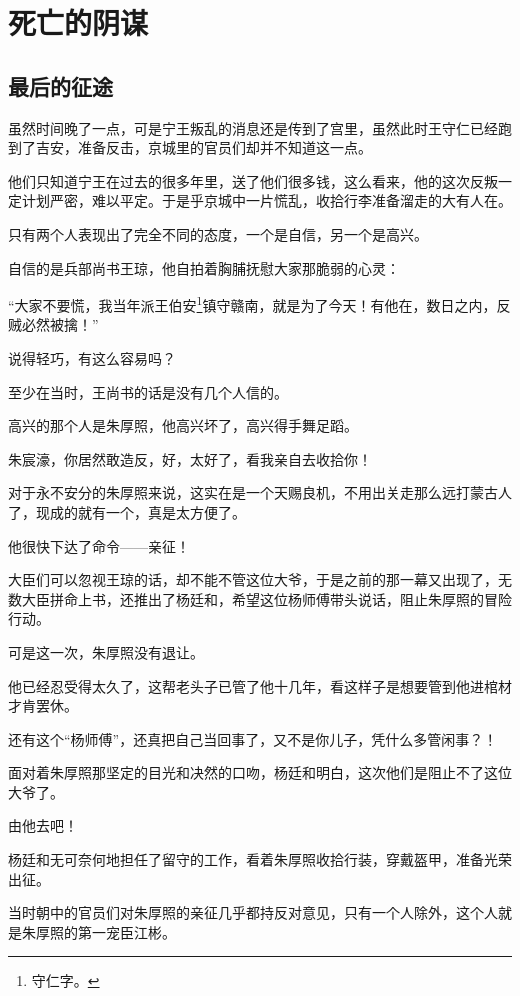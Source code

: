 \section{死亡的阴谋}
\ifnum{}
	\begin{multicols}{\theparacolNo}
		\fi
		\subsection{最后的征途}
		虽然时间晚了一点，可是宁王叛乱的消息还是传到了宫里，虽然此时王守仁已经跑到了吉安，准备反击，京城里的官员们却并不知道这一点。

		他们只知道宁王在过去的很多年里，送了他们很多钱，这么看来，他的这次反叛一定计划严密，难以平定。于是乎京城中一片慌乱，收拾行李准备溜走的大有人在。

		只有两个人表现出了完全不同的态度，一个是自信，另一个是高兴。

		自信的是兵部尚书王琼，他自拍着胸脯抚慰大家那脆弱的心灵：

		“大家不要慌，我当年派王伯安\footnote{守仁字。}镇守赣南，就是为了今天！有他在，数日之内，反贼必然被擒！”

		说得轻巧，有这么容易吗？

		至少在当时，王尚书的话是没有几个人信的。

		高兴的那个人是朱厚照，他高兴坏了，高兴得手舞足蹈。

		朱宸濠，你居然敢造反，好，太好了，看我亲自去收拾你！

		对于永不安分的朱厚照来说，这实在是一个天赐良机，不用出关走那么远打蒙古人了，现成的就有一个，真是太方便了。

		他很快下达了命令——亲征！

		大臣们可以忽视王琼的话，却不能不管这位大爷，于是之前的那一幕又出现了，无数大臣拼命上书，还推出了杨廷和，希望这位杨师傅带头说话，阻止朱厚照的冒险行动。

		可是这一次，朱厚照没有退让。

		他已经忍受得太久了，这帮老头子已管了他十几年，看这样子是想要管到他进棺材才肯罢休。

		还有这个“杨师傅”，还真把自己当回事了，又不是你儿子，凭什么多管闲事？！

		面对着朱厚照那坚定的目光和决然的口吻，杨廷和明白，这次他们是阻止不了这位大爷了。

		由他去吧！

		杨廷和无可奈何地担任了留守的工作，看着朱厚照收拾行装，穿戴盔甲，准备光荣出征。

		当时朝中的官员们对朱厚照的亲征几乎都持反对意见，只有一个人除外，这个人就是朱厚照的第一宠臣江彬。


\end{multicols}

